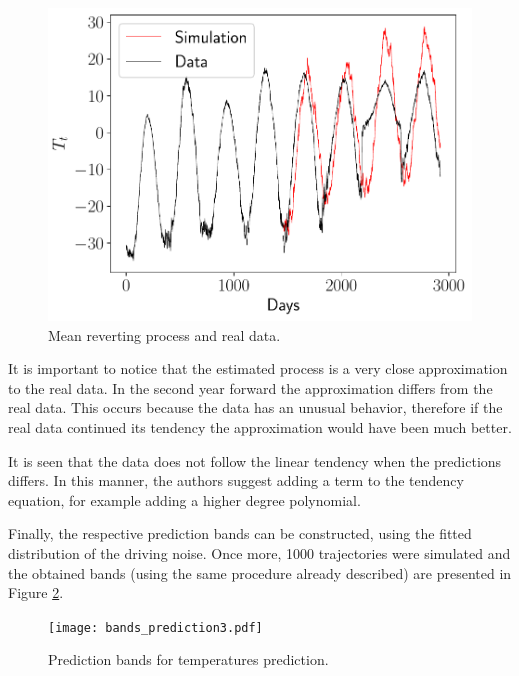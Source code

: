 \documentclass[11pt]{article}
\theoremstyle{definition}
\theoremstyle{remark}
\theoremstyle{remark}
\begin{document}
\begin{figure}[H]
  \centering
  \includegraphics[scale=.5]{pred_estimated_temps.pdf}
  \caption{Mean reverting process and real data.}
  \label{fig:pred3}
\end{figure}

It is important to notice that the estimated process is a very close
approximation to the real data. In the second year forward the
approximation differs from the real data. This occurs because the data
has an unusual behavior, therefore if the real data continued its
tendency the approximation would have been much better.

It is seen that the data does not follow the linear tendency when the
predictions differs. In this manner, the authors suggest adding a term
to the tendency equation, for example adding a higher degree
polynomial.

Finally, the respective prediction bands can be constructed, using the fitted
distribution of the driving noise. Once more, 1000 trajectories were simulated
and the obtained bands (using the same procedure already described) are
presented in Figure \ref{fig:bands3}.

\begin{figure}[H]
  \centering
  \texttt{[image: bands\_prediction3.pdf]}
  \caption{Prediction bands for temperatures prediction.}
  \label{fig:bands3}
\end{figure}

\FloatBarrier
\printbibliography
\end{document}
